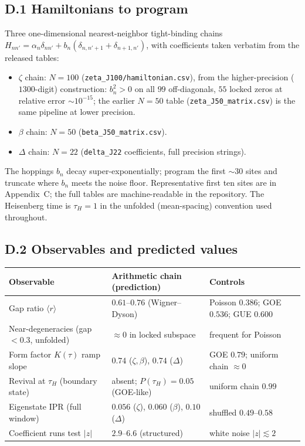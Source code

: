 \documentclass[aps,prx,reprint,floatfix]{revtex4-2}
\begin{document}
\subsection{D.1 Hamiltonians to program}
Three one-dimensional nearest-neighbor tight-binding chains
$H_{nn'}=\alpha_n\delta_{nn'}+b_n(\delta_{n,n'+1}+\delta_{n+1,n'})$,
with coefficients taken verbatim from the released tables:
\begin{itemize}[leftmargin=1.4em]
\item $\zeta$ chain: $N=100$ (\texttt{zeta\_J100/hamiltonian.csv}), from the
higher-precision ($1300$-digit) construction: $b_n^2>0$ on all $99$
off-diagonals, $55$ locked zeros at relative error $\sim10^{-15}$; the earlier
$N=50$ table (\texttt{zeta\_J50\_matrix.csv}) is the same pipeline at lower
precision.
\item $\beta$ chain: $N=50$ (\texttt{beta\_J50\_matrix.csv}).
\item $\Delta$ chain: $N=22$ (\texttt{delta\_J22} coefficients, full
precision strings).
\end{itemize}
The hoppings $b_n$ decay super-exponentially; program the first $\sim30$
sites and truncate where $b_n$ meets the noise floor. Representative first
ten sites are in Appendix~C; the full tables are machine-readable in the
repository. The Heisenberg time is $\tau_H=1$ in the unfolded (mean-spacing)
convention used throughout.

\subsection{D.2 Observables and predicted values}
\begin{center}\small
\begin{tabular}{lll}
\toprule
Observable & Arithmetic chain (prediction) & Controls \\
\midrule
Gap ratio $\langle r\rangle$ & $0.61$--$0.76$ (Wigner--Dyson) &
  Poisson $0.386$; GOE $0.536$; GUE $0.600$\\
Near-degeneracies (gap$<0.3$, unfolded) & $\approx0$ in locked subspace &
  frequent for Poisson\\
Form factor $K(\tau)$ ramp slope & $0.74$ ($\zeta,\beta$), $0.74$ ($\Delta$) &
  GOE $0.79$; uniform chain $\approx0$\\
Revival at $\tau_H$ (boundary state) & absent; $P(\tau_H)=0.05$ (GOE-like) &
  uniform chain $0.99$\\
Eigenstate IPR (full window) & $0.056$ ($\zeta$), $0.060$ ($\beta$),
  $0.10$ ($\Delta$) & shuffled $0.49$--$0.58$\\
Coefficient runs test $|z|$ & $2.9$--$6.6$ (structured) & white noise $|z|\lesssim2$\\
\bottomrule
\end{tabular}
\end{center}
\end{document}
